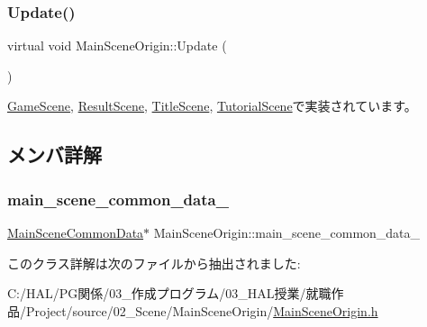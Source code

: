 \subsubsection{\texorpdfstring{Update()}{Update()}}
{\footnotesize\ttfamily virtual void Main\+Scene\+Origin\+::\+Update (\begin{DoxyParamCaption}{ }\end{DoxyParamCaption})\hspace{0.3cm}{\ttfamily [pure virtual]}}



\mbox{\hyperlink{class_game_scene_abcecddeb12cf3cd8e927235c5217f8a3}{Game\+Scene}}, \mbox{\hyperlink{class_result_scene_ac56b2e5d453653aef1f63f2d0fe7f2e2}{Result\+Scene}}, \mbox{\hyperlink{class_title_scene_a4d4e98579e09afbff30399ce4bc6036f}{Title\+Scene}}, \mbox{\hyperlink{class_tutorial_scene_ad4bdf89bbf5ff50005ac6771853f6525}{Tutorial\+Scene}}で実装されています。



\subsection{メンバ詳解}
\mbox{\label{class_main_scene_origin_a42ad5acaa22cb93b81f76859d588e46c}} 
\subsubsection{\texorpdfstring{main\+\_\+scene\+\_\+common\+\_\+data\+\_\+}{main\_scene\_common\_data\_}}
{\footnotesize\ttfamily \mbox{\hyperlink{struct_main_scene_common_data}{Main\+Scene\+Common\+Data}}$\ast$ Main\+Scene\+Origin\+::main\+\_\+scene\+\_\+common\+\_\+data\+\_\+}



このクラス詳解は次のファイルから抽出されました\+:\begin{DoxyCompactItemize}
\item 
C\+:/\+H\+A\+L/\+P\+G関係/03\+\_\+作成プログラム/03\+\_\+\+H\+A\+L授業/就職作品/\+Project/source/02\+\_\+\+Scene/\+Main\+Scene\+Origin/\mbox{\hyperlink{_main_scene_origin_8h}{Main\+Scene\+Origin.\+h}}\end{DoxyCompactItemize}
